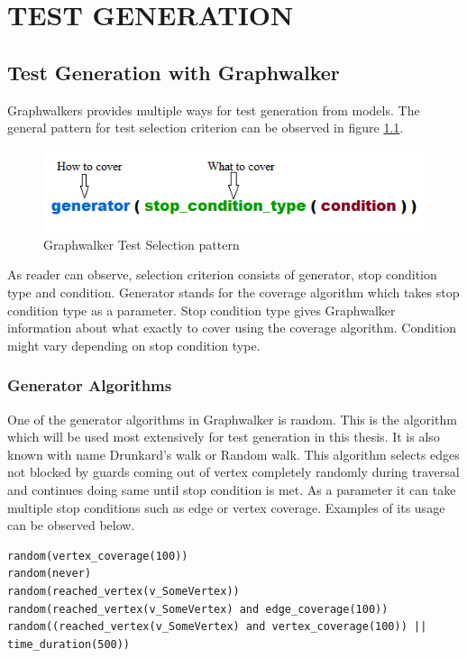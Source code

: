 \chapter{TEST GENERATION}
\label{chapter:test_generation}

\section{Test Generation with Graphwalker}
\par
Graphwalkers provides multiple ways for test generation from models. The general pattern for test selection criterion can be observed in figure \ref{Fig:raphwalker_testselection_example}.

\begin{figure} [htbp!]
	\centering
					\includegraphics[width=1\textwidth]{figures/Graphwalker_testselection_example.png}
					\caption{\label{Fig:raphwalker_testselection_example} Graphwalker Test Selection pattern}
\end{figure}
\par
As reader can observe, selection criterion consists of generator, stop condition type and condition. Generator stands for the coverage algorithm which takes stop condition type as a parameter. Stop condition type gives Graphwalker information about what exactly to cover using the coverage algorithm. Condition might vary depending on stop condition type.

\subsection{Generator Algorithms}
\par
One of the generator algorithms in Graphwalker is random. This is the algorithm which will be used most extensively for test generation in this thesis. It is also known with name Drunkard's walk or Random walk. This algorithm selects edges not blocked by guards coming out of vertex completely randomly during traversal and continues doing same until stop condition is met. As a parameter it can take multiple stop conditions such as edge or vertex coverage. Examples of its usage can be observed below. 
\begin{lstlisting}
random(vertex_coverage(100))
random(never)
random(reached_vertex(v_SomeVertex))
random(reached_vertex(v_SomeVertex) and edge_coverage(100))
random((reached_vertex(v_SomeVertex) and vertex_coverage(100)) || time_duration(500))
\end{lstlisting}

